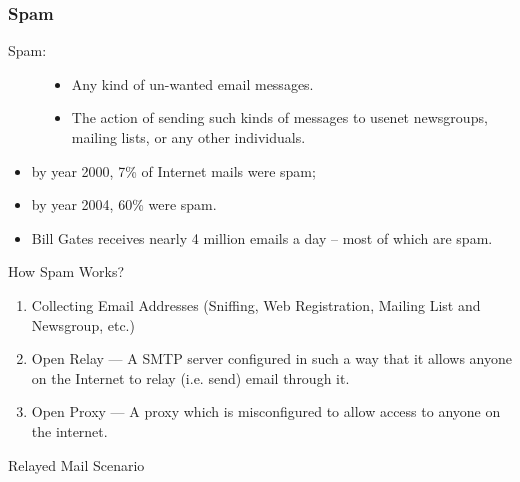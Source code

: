 \subsubsection{Spam}

\begin{frame}{}
  \begin{description}
  \item[Spam:]
    \begin{itemize}
    \item Any kind of un-wanted email messages.
    \item The action of sending such kinds of messages to usenet newsgroups, mailing
      lists, or any other individuals.
    \end{itemize}
  \end{description}
  \begin{itemize}
  \item by year 2000, 7\% of Internet mails were spam;
  \item by year 2004, 60\% were spam.
  \item Bill Gates receives nearly 4 million emails a day -- most of which are spam.
  \end{itemize}
\end{frame}

\begin{frame}{How Spam Works?}
  \begin{enumerate}
  \item Collecting Email Addresses (Sniffing, Web Registration, Mailing List and
    Newsgroup, etc.)
  \item Open Relay --- A SMTP server configured in such a way that it allows anyone on
    the Internet to relay (i.e. send) email through it.
  \item Open Proxy --- A proxy which is misconfigured to allow access to anyone on the
    internet.
  \end{enumerate}
\end{frame}

\begin{frame}
  \begin{block}{Relayed Mail Scenario}
    \begin{center}
    \end{center}
    \label{fig:relay}
  \end{block}
\end{frame}

